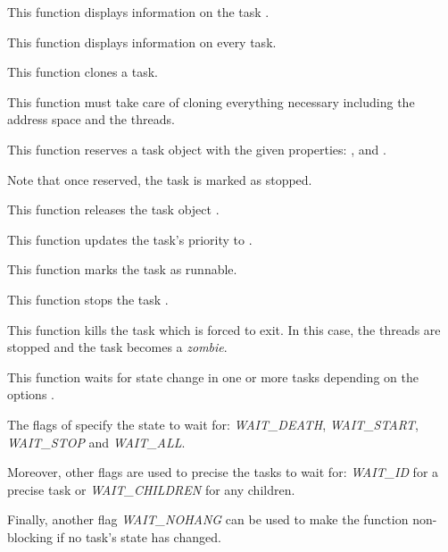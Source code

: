 	 {
	   This function displays information on the task .
	 }

	 {
	   This function displays information on every task.
	 }

	 {
	   This function clones a task.

	   This function must take care of cloning everything necessary
	   including the address space and the threads.
	 }

	 {
	   This function reserves a task object with the given
	   properties: ,  and
	   .

	   Note that once reserved, the task is marked as stopped.
	 }

	 {
	   This function releases the task object .
	 }

	 {
	   This function updates the task's priority to .
	 }

	 {
	   This function marks the task as runnable.
	 }

	 {
	   This function stops the task .
	 }

	 {
	   This function kills the task  which is forced to
	   exit. In this case, the threads are stopped and the task becomes
	   a \textit{zombie}.
	 }

	 {
	   This function waits for state change in one or more tasks
	   depending on the options .

	   The flags of  specify the state to wait for:
	   \textit{WAIT\_DEATH}, \textit{WAIT\_START},
	   \textit{WAIT\_STOP} and \textit{WAIT\_ALL}.

	   Moreover, other flags are used to precise the tasks to wait for:
	   \textit{WAIT\_ID} for a precise task  or
	   \textit{WAIT\_CHILDREN} for any children.

	   Finally, another flag \textit{WAIT\_NOHANG} can be used
	   to make the function non-blocking if no task's state has changed.

	 }

